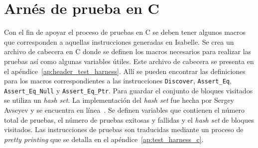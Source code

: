 \begin{comment}
El algoritmo opera de la siguiente manera:
Primero, se intenta acceder al bloque, para ver si la memoria está libre o tiene contenido alguno.
Si la memoria está libre se retorna el mismo conjunto de bloques visitados y no se genera instrucción extra alguna.
Si la memoria no está libre, se ajusta la dirección al inicio del bloque, esto es porque al chequear la memoria queremos revisar los bloques completos ya que son parte de la memoria alcanzable.
Si el bloque que se está revisando pertenece ya al conjunto de visitados, simplemente se retorna el mismo conjunto de visitados y una instrucción \verb|Assert_Eq_Ptr| para chequear los apuntadores.
No obstante, si el bloque que se está revisando es un bloque que no ha sido \textit{visto} aun, se agrega al conjunto de visitados y se agrega una instrucción \verb|Discover| a la lista de instrucciones generadas.

Luego se chequea el contenido del bloque de memoria, comenzando por la primera celda hasta la última celda del bloque.
Al chequear cada celda se revisa si el contenido de la celda es un valor entero, \verb|NULL| o una dirección.
Si la celda contiene un valor entero, se retorna el mismo conjunto de visitados y se agrega una instrucción \verb|Assert_Eq| a la lista de instrucciones generadas.
Si la celda contiene un valor \verb|NULL|, se retorna el mismo conjunto de visitados y se agrega una instrucción \verb|Assert_Eq_Null| a la lista de instrucciones generadas.
Finalmente, si la celda contiene una dirección, se debe seguir esa dirección haciendo una llamada recursiva a \verb|dfs| antes de continuar revisando el bloque de memoria actual.
Al retornar de esta llamada, se retorna el nuevo conjunto de visitados resultante de la llamada recursiva y se agrega a la lista de instrucciones generadas hasta el momento la lista de instrucciones que retorna la llamada recursiva.
\end{comment}


\section{Arnés de prueba en C}

Con el fin de apoyar el proceso de pruebas en C se deben tener algunos macros que corresponden a aquellas instrucciones generadas en Isabelle.
Se crea un archivo de cabecera en C donde se definen los macros necesarios para realizar las pruebas así como algunas variables útiles.
Este archivo de cabecera se presenta en el apéndice~\ref{ap:header_test_harness}.
Allí se pueden encontrar las definiciones para los macros correspondientes a las instrucciones \verb|Discover|, \verb|Assert_Eq|, \verb|Assert_Eq_Null| y \verb|Assert_Eq_Ptr|.
Para guardar el conjunto de bloques visitados se utiliza un \textit{hash set}.
La implementación del \textit{hash set} fue hecha por Sergey Avseyev y se encuentra en línea~\citep{hashset}.
Se definen variables que contienen el número total de pruebas, el número de pruebas exitosas y fallidas y el \textit{hash set} de bloques visitados.
Las instrucciones de pruebas son traducidas mediante un proceso de \textit{pretty printing} que se detalla en el apéndice~\ref{ap:test_harness_c}.

